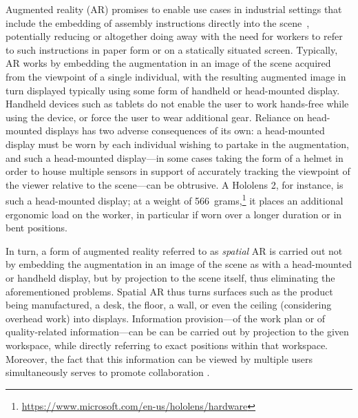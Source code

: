 \documentclass[review]{elsarticle}
\begin{document}
Augmented reality (AR) \cite{van2010survey,zhou2008trends} promises to enable use cases in industrial settings that include the embedding of assembly instructions directly into the scene~\cite{schlund2018moglichkeiten,uva2018evaluating,masood2019augmented,gattullo2019towards,aschenbrenner2019comparing,mayrhofer2019one,rupprecht2020information,Rupprecht2021}, potentially reducing or altogether doing away with the need for workers to refer to such instructions in paper form or on a statically situated screen. Typically, AR works by embedding the augmentation in an image of the scene acquired from the viewpoint of a single individual, with the resulting augmented image in turn displayed typically using some form of handheld or head-mounted display. Handheld devices such as tablets do not enable the user to work hands-free while using the device, or force the user to wear additional gear. Reliance on head-mounted displays has two adverse consequences of its own: a head-mounted display must be worn by each individual wishing to partake in the augmentation, and such a head-mounted display---in some cases taking the form of a helmet in order to house multiple sensors in support of accurately tracking the viewpoint of the viewer relative to the scene---can be obtrusive. A Hololens 2, for instance, is such a head-mounted display; at a weight of 566~grams,\footnote{\url{https://www.microsoft.com/en-us/hololens/hardware}} it places an additional ergonomic load on the worker, in particular if worn over a longer duration or in bent positions.

In turn, a form of augmented reality referred to as \textit{spatial} AR\cite{bimber2019spatial} is carried out not by embedding the augmentation in an image of the scene as with a head-mounted or handheld display, but by projection to the scene itself, thus eliminating the aforementioned problems. Spatial AR thus turns surfaces such as the product being manufactured, a desk, the floor, a wall, or even the ceiling (considering overhead work) into displays. Information provision---of the work plan or of quality-related information---can be can be carried out by projection to the given workspace, while directly referring to exact positions within that workspace. Moreover, the fact that this information can be viewed by multiple users simultaneously serves to promote collaboration \cite{aschenbrenner2019comparing}.
\end{document}
